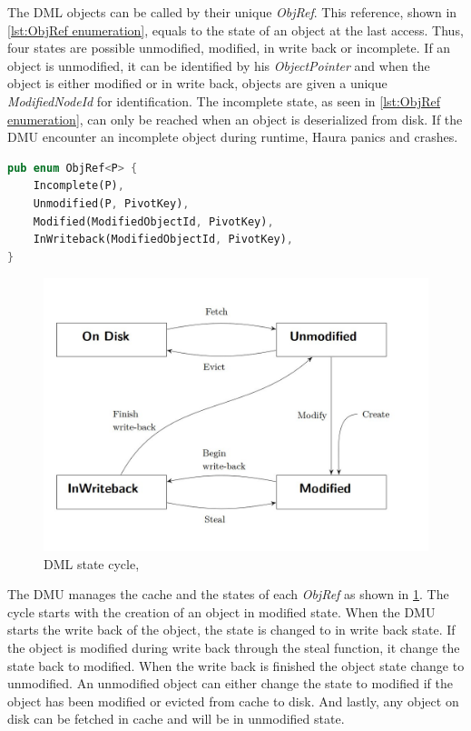 \documentclass[
	12pt,
	a4paper,
	abstract,
	bibliography=totoc,
	chapterprefix,
	headings=openright,
	numbers=endperiod,
	parskip=half,
	twoside,
]{scrreprt}
\begin{document}
The DML objects can be called by their unique \emph{ObjRef}.
This reference, shown in \cref{lst:ObjRef enumeration}, equals to the state of an object at the last access.
Thus, four states are possible unmodified, modified, in write back or incomplete.
If an object is unmodified, it can be identified by his \emph{ObjectPointer} and
when the object is either modified or in write back, objects are given a unique \emph{ModifiedNodeId} for identification.
The incomplete state, as seen in \cref{lst:ObjRef enumeration}, can only be reached when an object is deserialized from disk.
If the DMU encounter an incomplete object during runtime, Haura panics and crashes.

\bigskip

\begin{lstlisting}[language=Rust,mathescape=true,caption={ObjRef enumeration, parameter P equals \&ObjectPointer<D>},
	label=lst:ObjRef enumeration]
pub enum ObjRef<P> {
    Incomplete(P),
    Unmodified(P, PivotKey),
    Modified(ModifiedObjectId, PivotKey),
    InWriteback(ModifiedObjectId, PivotKey),
}
\end{lstlisting}

\begin{figure}[ht]
	\centering
	\includegraphics[scale=0.4]{DML_state_cycle.jpg}
	\caption{DML state cycle, \cite{wiedemann2018modern}}
		\label{fig:DML state cycle}
\end{figure}

The DMU manages the cache and the states of each \emph{ObjRef} as shown in \ref{fig:DML state cycle}.
The cycle starts with the creation of an object in modified state. When the DMU starts the write back of the object, the state
is changed to in write back state.
If the object is modified during write back through the steal function, it change the state back to modified.
When the write back is finished the object state change to unmodified.
An unmodified object can either change the state to modified if the object has been modified or evicted from cache to disk.
And lastly, any object on disk can be fetched in cache and will be in unmodified state.
\end{document}
